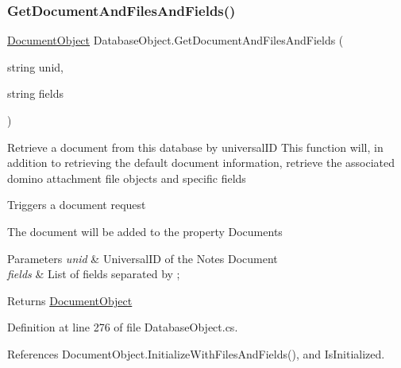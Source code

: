 \subsubsection{\texorpdfstring{Get\+Document\+And\+Files\+And\+Fields()}{GetDocumentAndFilesAndFields()}\hspace{0.1cm}{\footnotesize\ttfamily [2/2]}}
{\footnotesize\ttfamily \mbox{\hyperlink{class_document_object}{Document\+Object}} Database\+Object.\+Get\+Document\+And\+Files\+And\+Fields (\begin{DoxyParamCaption}\item[{string}]{unid,  }\item[{string}]{fields }\end{DoxyParamCaption})}



Retrieve a document from this database by universal\+ID This function will, in addition to retrieving the default document information, retrieve the associated domino attachment file objects and specific fields 

Triggers a document request

The document will be added to the property \textquotesingle{}Documents\textquotesingle{}


\begin{DoxyParams}{Parameters}
{\em unid} & Universal\+ID of the Notes Document\\
\hline
{\em fields} & List of fields separated by ; \\
\hline
\end{DoxyParams}
\begin{DoxyReturn}{Returns}
\mbox{\hyperlink{class_document_object}{Document\+Object}}
\end{DoxyReturn}


Definition at line 276 of file Database\+Object.\+cs.



References Document\+Object.\+Initialize\+With\+Files\+And\+Fields(), and Is\+Initialized.



